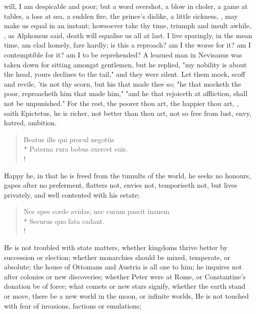 {will, I am despicable and poor; but a word overshot, a blow in choler, a game at tables, a loss at sea, a sudden fire, the prince's dislike, a little sickness, \etc{}, may make us equal in an instant; howsoever take thy time, triumph and insult awhile, , as Alphonsus said, death will equalise us all at last. I live sparingly, in the mean time, am clad homely, fare hardly; is this a reproach? am I the worse for it? am I contemptible for it? am I to be reprehended? A learned man in Nevisanus was taken down for sitting amongst gentlemen, but he replied, "my nobility is about the head, yours declines to the tail," and they were silent. Let them mock, scoff and revile, 'tis not thy scorn, but his that made thee so; "he that mocketh the poor, reproacheth him that made him,"  "and he that rejoiceth at affliction, shall not be unpunished." For the rest, the poorer thou art, the happier thou art, , saith Epictetus, he is richer, not better than thou art, not so free from lust, envy, hatred, ambition.

\begin{latin}
\begin{verse}%
Beatus ille qui procul negotiis\\*
Paterna rura bobus exercet suis.\\!
\end{verse}%
\end{latin}

Happy he, in that he is freed from the tumults of the world, he seeks no honours, gapes after no preferment, flatters not, envies not, temporiseth not, but lives privately, and well contented with his estate;

\begin{latin}
\begin{verse}%
Nec spes corde avidas, nec curam pascit inanem\\*
Securus quo fata cadant.\\!
\end{verse}%
\end{latin}

He is not troubled with state matters, whether kingdoms thrive better by succession or election; whether monarchies should be mixed, temperate, or absolute; the house of Ottomans and Austria is all one to him; he inquires not after colonies or new discoveries; whether Peter were at Rome, or Constantine's donation be of force; what comets or new stars signify, whether the earth stand or move, there be a new world in the moon, or infinite worlds, \etc{} He is not touched with fear of invasions, factions or emulations;

}
